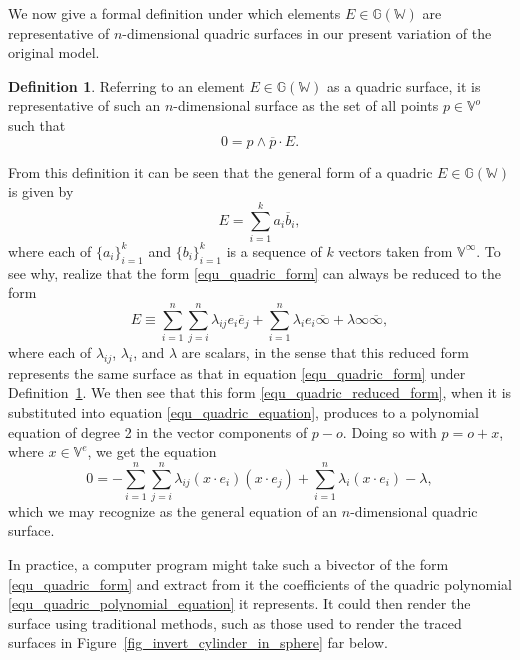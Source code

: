 \documentclass{birkjour}
\theoremstyle{definition}
\newtheorem{defn}[thm]{Definition}
\theoremstyle{remark}
\numberwithin{equation}{section}
\newcommand{\G}{\mathbb{G}}
\newcommand{\V}{\mathbb{V}}
\newcommand{\W}{\mathbb{W}}
\newcommand{\nvao}{o}
\newcommand{\nvai}{\infty}
\newcommand{\nvaib}{\overline{\infty}}
\begin{document}
We now give a formal definition under which elements $E\in\G(\W)$
are representative of $n$-dimensional quadric surfaces in our present variation
of the original model.
\begin{defn}\label{def_quadric}
Referring to an element $E\in\G(\W)$ as a quadric surface, it is representative of such an $n$-dimensional surface as the set of all points $p\in\V^o$ such that
\begin{equation}\label{equ_quadric_equation}
0 = p\wedge\overline{p}\cdot E.
\end{equation}
\end{defn}
From this definition it can be seen that the general form of a quadric $E\in\G(\W)$ is given by
\begin{equation}\label{equ_quadric_form}
E = \sum_{i=1}^k a_i\overline{b}_i,
\end{equation}
where each of $\{a_i\}_{i=1}^k$ and $\{b_i\}_{i=1}^k$ is a sequence of $k$ vectors
taken from $\V^\nvai$.  To see why, realize that the form \eqref{equ_quadric_form} can
always be reduced to the form
\begin{equation}\label{equ_quadric_reduced_form}
E \equiv \sum_{i=1}^n\sum_{j=i}^n\lambda_{ij}e_i\overline{e}_j+
\sum_{i=1}^n\lambda_i e_i\nvaib+
\lambda\nvai\nvaib,
\end{equation}
where each of $\lambda_{ij}$, $\lambda_i$, and $\lambda$ are scalars, in the
sense that this reduced form represents the same surface as that in equation \eqref{equ_quadric_form}
under Definition~\ref{def_quadric}.
We then see that this form \eqref{equ_quadric_reduced_form}, when it is
substituted into equation \eqref{equ_quadric_equation}, produces to a polynomial
equation of degree 2 in the vector components of $p-\nvao$.
Doing so with $p=\nvao+x$, where $x\in\V^e$, we get the equation
\begin{equation}\label{equ_quadric_polynomial_equation}
0 = -\sum_{i=1}^n\sum_{j=i}^n\lambda_{ij}(x\cdot e_i)(x\cdot e_j)
+\sum_{i=1}^n\lambda_i(x\cdot e_i) - \lambda,
\end{equation}
which we may recognize as the general equation of an $n$-dimensional quadric surface.

In practice, a computer program might take such a bivector of the form \eqref{equ_quadric_form}
and extract from it the coefficients of the quadric
polynomial \eqref{equ_quadric_polynomial_equation} it
represents.  It could then render the surface using traditional methods, such as those used
to render the traced surfaces in Figure~\ref{fig_invert_cylinder_in_sphere} far below.
\end{document}
